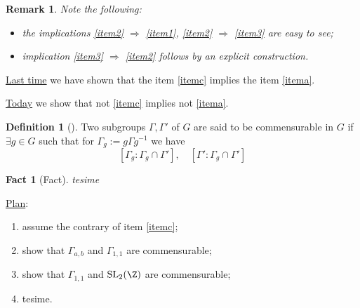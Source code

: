 \documentclass[a4paper,12pt]{article}
\newtheorem{remark}{Remark}
\newtheorem{fact}{Fact}
\theoremstyle{definition}
\newtheorem{definition}{Definition}
\renewcommand{\implies}{\Rightarrow}
\begin{document}
\begin{remark}
	Note the following:\begin{itemize}
		\item the implications \ref{item2} $\implies$ \ref{item1}, \ref{item2} $\implies$ \ref{item3} are easy to see;
		\item implication \ref{item3} $\implies$ \ref{item2} follows by an explicit construction.
	\end{itemize}
\end{remark}

\underline{Last time} we have shown that the item \ref{itemc} implies the item \ref{itema}.

\underline{Today} we show that not \ref{itemc} implies not \ref{itema}.

\begin{definition}[{\cite[p.36]{bergeron2016spectrum}}]
	Two subgroups $\Gamma,\Gamma'$ of $G$ are said to be commensurable in $G$ if $\exists g\in G$ such that for $\Gamma_{g}:=g\Gamma g^{-1}$ we have\begin{equation*}
		\left[  \Gamma_g:\Gamma_g
		\cap \Gamma'\right],\quad \left[ \Gamma':\Gamma_g\cap \Gamma' \right]
	\end{equation*}
\end{definition}

\begin{fact}[Fact]
	tesime
\end{fact}

\underline{Plan}:\begin{enumerate}
	\item assume the contrary of item \ref{itemc};
	\item show that $\Gamma_{a,b}$ and $\Gamma_{1,1}$ are commensurable;
	\item show that $\Gamma_{1,1}$ and $\mbox{\normalfont SL}_2(\Z)$ are commensurable;
	\item tesime. 
\end{enumerate}



\end{document}
